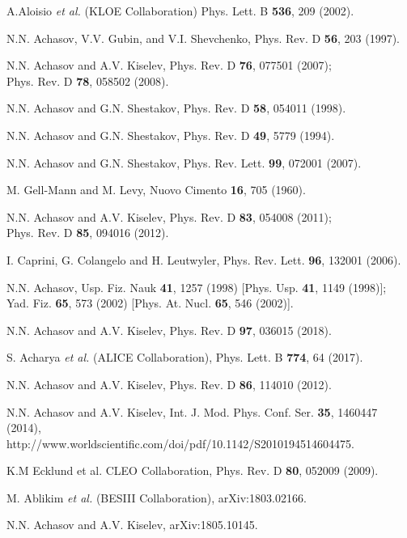 \documentclass[aps,preprint,groupedaddress,floatfix]{revtex4}
\begin{document}
\begin{thebibliography}{99}
A.Aloisio {\it et al.} (KLOE Collaboration) Phys. Lett. B {\bf
536}, 209 (2002).

N.N. Achasov, V.V. Gubin, and V.I. Shevchenko, Phys. Rev. D {\bf
56}, 203 (1997).

N.N. Achasov and A.V. Kiselev, Phys. Rev. D {\bf 76}, 077501
(2007);\\ Phys. Rev. D {\bf 78}, 058502 (2008).

N.N. Achasov and G.N. Shestakov, Phys. Rev. D {\bf 58}, 054011
(1998).

N.N. Achasov and G.N. Shestakov, Phys. Rev. D {\bf 49}, 5779
(1994).

N.N. Achasov and G.N. Shestakov, Phys. Rev. Lett. {\bf 99}, 072001
(2007).

M. Gell-Mann and M. Levy, Nuovo Cimento {\bf 16}, 705 (1960).

N.N. Achasov and A.V. Kiselev, Phys. Rev. D {\bf 83}, 054008
(2011);\\ Phys. Rev. D {\bf 85}, 094016 (2012).

I. Caprini, G. Colangelo and H. Leutwyler, Phys. Rev. Lett. {\bf
96}, 132001 (2006).

N.N. Achasov, Usp. Fiz. Nauk {\bf 41}, 1257 (1998) [Phys. Usp.
{\bf 41}, 1149 (1998)];\\ Yad. Fiz. {\bf 65}, 573 (2002) [Phys.
At. Nucl. {\bf 65}, 546 (2002)].

N.N. Achasov and A.V. Kiselev, Phys. Rev. D {\bf 97}, 036015
(2018).

S. Acharya {\it et al.} (ALICE Collaboration), Phys. Lett. B {\bf
774}, 64 (2017).

N.N. Achasov and A.V. Kiselev, Phys. Rev. D {\bf 86}, 114010
(2012).

N.N. Achasov and A.V. Kiselev, Int. J. Mod. Phys. Conf. Ser. {\bf
35}, 1460447 (2014),\\
http://www.worldscientific.com/doi/pdf/10.1142/S2010194514604475.

K.M Ecklund et al. CLEO Collaboration, Phys. Rev. D {\bf 80},
052009 (2009).

M. Ablikim {\it et al.} (BESIII Collaboration), arXiv:1803.02166.


N.N. Achasov and A.V. Kiselev, arXiv:1805.10145.


\end{thebibliography}
\end{document}
